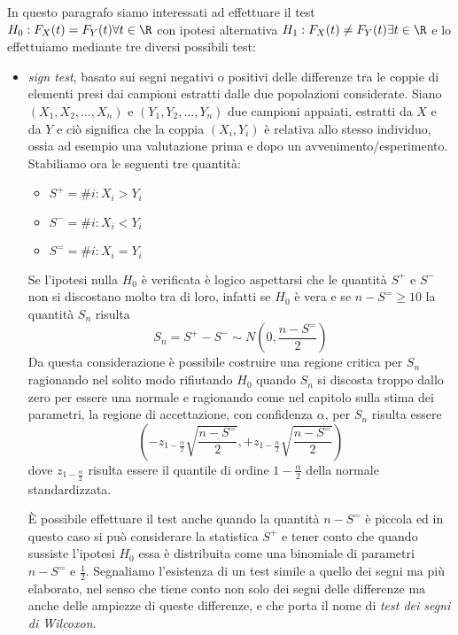 In questo paragrafo siamo interessati ad effettuare il test $H_0:F_X(t) = F_Y(t) \forall t \in \R$ con ipotesi
alternativa $H_1:F_X(t) \neq F_Y(t) \exists t \in \R$ e lo effettuiamo mediante tre diversi possibili test:
\begin{itemize}
    \item \emph{sign test}, basato sui segni negativi o positivi delle differenze tra le coppie di elementi
          presi dai campioni estratti dalle due popolazioni considerate.\newline
          Siano $(X_1, X_2, \dots, X_n)$ e $(Y_1, Y_2, \dots, Y_n)$ due campioni appaiati, estratti da $X$ e da $Y$ e
          ciò significa che la coppia $(X_i, Y_i)$ è relativa allo stesso individuo, ossia ad esempio una valutazione
          prima e dopo un avvenimento/esperimento.\newline
          Stabiliamo ora le seguenti tre quantità:
          \begin{itemize}
              \item $S^+ = \#i : X_i > Y_i$
              \item $S^- = \#i : X_i < Y_i$
              \item $S^= = \#i : X_i = Y_i$
          \end{itemize}
          Se l'ipotesi nulla $H_0$ è verificata è logico aspettarsi che le quantità $S^+$ e $S^-$ non si discostano
          molto tra di loro, infatti se $H_0$ è vera e se $n - S^= \geq 10$ la quantità $S_n$ risulta
          \[ S_n = S^+ - S^- \sim N(0, \frac{n - S^=}{2}) \]
          Da questa considerazione è possibile costruire una regione critica per $S_n$ ragionando nel solito modo 
          rifiutando $H_0$ quando $S_n$ si discosta troppo dallo zero per essere una normale e ragionando come nel
          capitolo sulla stima dei parametri, la regione di accettazione, con confidenza $\alpha$, per $S_n$ risulta essere
          \[ (-z_{1 - \frac{\alpha}{2}} \sqrt{\frac{n - S^=}{2}}, +z_{1 - \frac{\alpha}{2}} \sqrt{\frac{n - S^=}{2}}) \]
          dove $z_{1 - \frac{\alpha}{2}}$ risulta essere il quantile di ordine $1 - \frac{\alpha}{2}$ della normale standardizzata.
          
          È possibile effettuare il test anche quando la quantità $n - S^=$ è piccola ed in questo caso si può considerare
          la statistica $S^+$ e tener conto che quando sussiste l'ipotesi $H_0$ essa è distribuita come una binomiale di
          parametri $n - S^=$ e $\frac{1}{2}$.\newline
          Segnaliamo l’esistenza di un test simile a quello dei segni ma più elaborato, nel senso che tiene conto 
          non solo dei segni delle differenze ma anche delle ampiezze di queste differenze, e che porta il nome di \emph{test dei segni di Wilcoxon}.
    

\end{itemize}
